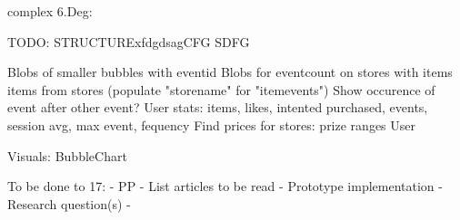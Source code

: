     complex 6.Deg:

TODO: STRUCTURExfdgdsagCFG
SDFG

    Blobs of smaller bubbles with eventid
    Blobs for eventcount on stores with items items from stores (populate "storename" for "itemevents")
    Show occurence of event after other event?
    User stats: items, likes, intented purchased, events, session avg, max event, fequency
    Find prices for stores: prize ranges
    User

Visuals:
    BubbleChart

To be done to 17:
    - PP
    - List articles to be read
    - Prototype implementation
    - Research question(s)
    -

